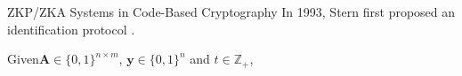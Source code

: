 \begin{frame}{ZKP/ZKA Systems in Code-Based Cryptography}
	In 1993, Stern first proposed an identification protocol \cite{Stern93}.
	
	Given$\mathbf{A} \in \{0,1\}^{n\times m}$, $\mathbf{y} \in \{0,1\}^n$ and $t \in \mathbb{Z}_+$, 
\end{frame}